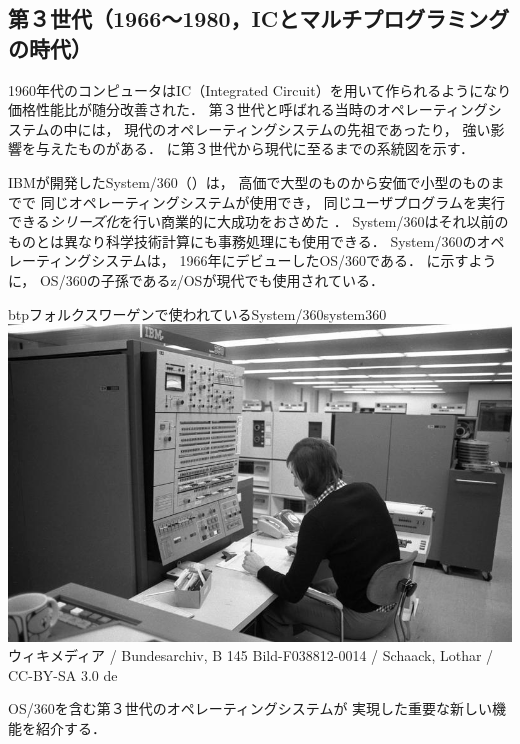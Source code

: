 \subsection{第３世代（1966〜1980，ICとマルチプログラミングの時代）}
1960年代のコンピュータはIC（Integrated Circuit）を用いて作られるようになり
価格性能比が随分改善された．
第３世代と呼ばれる当時のオペレーティングシステムの中には，
現代のオペレーティングシステムの先祖であったり，
強い影響を与えたものがある．
に第３世代から現代に至るまでの系統図を示す．


IBMが開発したSystem/360（）は，
高価で大型のものから安価で小型のものまでで
同じオペレーティングシステムが使用でき，
同じユーザプログラムを実行できる\emph{シリーズ化}を行い商業的に大成功をおさめた
\cite{third}．
System/360はそれ以前のものとは異なり科学技術計算にも事務処理にも使用できる．
System/360のオペレーティングシステムは，
1966年にデビューしたOS/360である．
に示すように，
OS/360の子孫であるz/OSが現代でも使用されている\cite{os360}．

\begin{myfig}{btp}{フォルクスワーゲンで使われているSystem/360}{system360}
  \includegraphics[scale=0.25]
  {Photo/Bundesarchiv_B_145_Bild-F038812-0014,_Wolfsburg,_VW_Autowerk.jpg}\\
  {\small
    ウィキメディア /
    Bundesarchiv, B 145 Bild-F038812-0014 /
    Schaack, Lothar / CC-BY-SA 3.0 de}
\end{myfig}

OS/360を含む第３世代のオペレーティングシステムが
実現した重要な新しい機能を紹介する．

